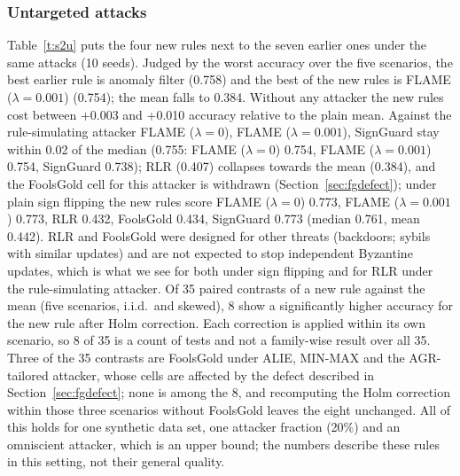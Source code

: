 \documentclass[conference]{IEEEtran}
\begin{document}
\subsubsection{Untargeted attacks}
Table~\ref{t:s2u} puts the four new rules next to the seven earlier ones under the same attacks (10 seeds). Judged by the worst accuracy over the five scenarios, the best earlier rule is anomaly filter (0.758) and the best of the new rules is FLAME ($\lambda{=}0.001$) (0.754); the mean falls to 0.384. Without any attacker the new rules cost between +0.003 and +0.010 accuracy relative to the plain mean. Against the rule-simulating attacker FLAME ($\lambda{=}0$), FLAME ($\lambda{=}0.001$), SignGuard stay within 0.02 of the median (0.755: FLAME ($\lambda{=}0$) 0.754, FLAME ($\lambda{=}0.001$) 0.754, SignGuard 0.738); RLR (0.407) collapses towards the mean (0.384), and the FoolsGold cell for this attacker is withdrawn (Section~\ref{sec:fgdefect}); under plain sign flipping the new rules score FLAME ($\lambda{=}0$) 0.773, FLAME ($\lambda{=}0.001$) 0.773, RLR 0.432, FoolsGold 0.434, SignGuard 0.773 (median 0.761, mean 0.442). RLR and FoolsGold were designed for other threats (backdoors; sybils with similar updates) and are not expected to stop independent Byzantine updates, which is what we see for both under sign flipping and for RLR under the rule-simulating attacker. Of 35 paired contrasts of a new rule against the mean (five scenarios, i.i.d.\ and skewed), 8 show a significantly higher accuracy for the new rule after Holm correction. Each correction is applied within its own scenario, so 8 of 35 is a count of tests and not a family-wise result over all 35. Three of the 35 contrasts are FoolsGold under ALIE, MIN-MAX and the AGR-tailored attacker, whose cells are affected by the defect described in Section~\ref{sec:fgdefect}; none is among the 8, and recomputing the Holm correction within those three scenarios without FoolsGold leaves the eight unchanged. All of this holds for one synthetic data set, one attacker fraction (20\%) and an omniscient attacker, which is an upper bound; the numbers describe these rules in this setting, not their general quality.
\end{document}
